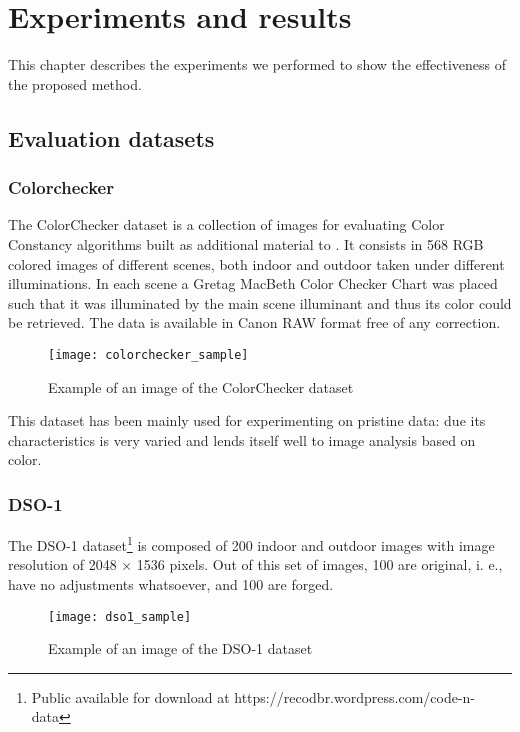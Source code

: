 \chapter{Experiments and results}

This chapter describes the experiments we performed to show the effectiveness of the proposed method. 

\section{Evaluation datasets}

\subsection{Colorchecker}

The ColorChecker dataset is a collection of images for evaluating Color Constancy algorithms built as additional material to \cite{gehler2008bayesian}. It consists in 568 RGB colored images of different scenes, both indoor and outdoor taken under different illuminations. In each scene a Gretag MacBeth Color Checker Chart was placed such that it was illuminated by the main scene illuminant and thus its color could be retrieved. The data is available in Canon RAW format free of any correction.

\begin{figure}[h!]
  \centering
    \texttt{[image: colorchecker\_sample]}
    \caption{Example of an image of the ColorChecker dataset}
    \label{fig:colorcheckersample}
\end{figure}

This dataset has been mainly used for experimenting on pristine data: due its characteristics is very varied and lends itself well to image analysis based on color.

\subsection{DSO-1}

The DSO-1 dataset\footnote{Public available for download at https://recodbr.wordpress.com/code-n-data} is composed of 200 indoor and outdoor images with image resolution of 2048 × 1536 pixels. Out of this set of images, 100 are original, i. e., have no adjustments whatsoever, and 100 are forged. 

\begin{figure}[h!]
  \centering
    \texttt{[image: dso1\_sample]}
    \caption{Example of an image of the DSO-1 dataset}
    \label{fig:dsosample}
\end{figure}

